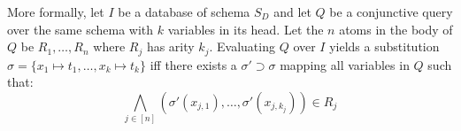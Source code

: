 
More formally,
 let $I$ be a database of schema $S_D$ and
 let $Q$ be a conjunctive query over the same schema
 with $k$ variables in its head.
Let the $n$ atoms in the body of
 $Q$ be $R_1, \ldots, R_n$
 where $R_j$ has arity $k_j$.
Evaluating $Q$ over $I$ yields
 a substitution
 $\sigma = \{ x_1 \mapsto t_1, \ldots, x_k \mapsto t_k \}$
 iff
 there exists a $\sigma' \supset \sigma$ mapping
 all variables in $Q$ such that:
\[
  \bigwedge_{j \in [n]}(\sigma'(x_{j,1}),\ldots,\sigma'(x_{j,k_j})) \in R_{j}
\]
%
%



